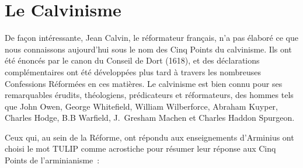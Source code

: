 \section{Le Calvinisme}

De façon intéressante, Jean Calvin, le réformateur français, n'a pas élaboré
 ce que nous connaissons aujourd'hui sous le nom des Cinq Points du calvinisme.
 Ils ont été énoncés par le canon du Conseil de Dort (1618), et des déclarations
 complémentaires ont été développées plus tard à travers les nombreuses
 Confessions Réformées en ces matières. Le calvinisme est bien connu
 pour 
 ses remarquables érudits, théologiens, prédicateurs et réformateurs,
 des hommes tels que John Owen, George Whitefield,
 William Wilberforce, Abraham Kuyper, Charles Hodge, B.B Warfield,
 J.~Gresham Machen et Charles Haddon Spurgeon.

Ceux qui, au sein de la Réforme, ont répondu aux enseignements d'Arminius
 ont choisi le mot \og TULIP \fg{} comme acrostiche pour résumer
 leur réponse aux Cinq Points de l'arminianisme~:

